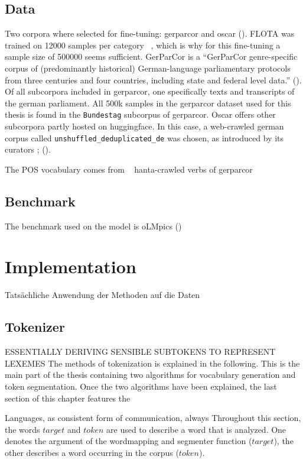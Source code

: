 \subsection{Data}
\label{subsec:data}
Two corpora where selected for fine-tuning: \ac{gerparcor} and oscar (\cite{oscar}).
FLOTA was trained on 12000 samples per  category ~\cite{FLOTA}, which is why for this fine-tuning a sample size of 500000 seems sufficient.
GerParCor is a \enquote{GerParCor genre-specific corpus of (predominantly historical) German-language parliamentary protocols from three centuries and four countries, including state and federal level data.} (\cite[1]{GERPARCOR}).
Of all subcorpora included in \ac{gerparcor}, one specifically texts and transcripts of the german parliament.
All 500k samples in the \ac{gerparcor} dataset used for this thesis is found in the \texttt{Bundestag} subcorpus of \ac{gerparcor}.
Oscar offers other subcorpora partly hosted on huggingface.
In this case, a web-crawled german corpus called \texttt{unshuffled\_deduplicated\_de} was chosen, as introduced by its curators \textcite{oscarsub2}; (\citeyear{oscarsub1}).

The POS vocabulary comes from ~\cite{wiktionary}
hanta-crawled verbs of gerparcor ~\cite{hanta}


\subsection{Benchmark}
\label{subsec:benchmark}
The benchmark used on the model is oLMpics (\cite{olmpics})

\section{Implementation}
\label{sec:implementation}

Tatsächliche Anwendung der Methoden auf die Daten

\subsection{Tokenizer}
\label{subsec:tokenizer}
\uppercase{essentially deriving sensible subtokens to represent lexemes}
The methods of tokenization is explained in the following.
This is the main part of the thesis containing two algorithms for vocabulary generation and token segmentation.
Once the two algorithms have been explained, the last section of this chapter features the


Languages, as consistent form of communication, always
Throughout this section, the words $target$ and $token$ are used to describe a word that is analyzed.
One denotes the argument of the wordmapping and segmenter function ($target$), the other describes a word occurring in the corpus ($token$).

